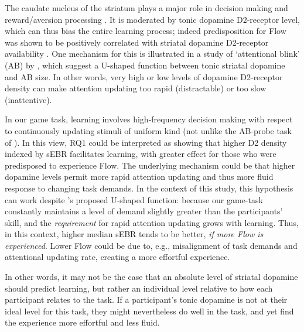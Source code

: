 \documentclass[10pt,letterpaper,floatsintext]{article}
\newcommand{\hl}{\textcolor{red!80}}
\begin{document}
The caudate nucleus of the striatum plays a major role in decision making and reward/aversion processing \citep{Slagter2015}. It is moderated by tonic dopamine D2-receptor level, which can thus bias the entire learning process; indeed predisposition for Flow was shown to be positively correlated with striatal dopamine D2-receptor availability \citep{DeManzano2013}. One mechanism for this is illustrated in a study of `attentional blink' (AB) by \citet{Slagter2012}, which suggest a U-shaped function between tonic striatal dopamine and AB size. In other words, very high or low levels of dopamine D2-receptor density can make attention updating too rapid (distractable) or too slow (inattentive).


In our game task, learning involves high-frequency decision making with respect to continuously updating stimuli of uniform kind (not unlike the AB-probe task of \citet{Slagter2012}). In this view, RQ1 could be interpreted as showing that higher D2 density indexed by sEBR facilitates learning, with greater effect for those who were predisposed to experience Flow. 
The underlying mechanism could be that higher dopamine levels permit more rapid attention updating and thus more fluid response to changing task demands. In the context of this study, this hypothesis can work despite \citet{Slagter2012}'s proposed U-shaped function: because our game-task constantly maintains a level of demand slightly greater than the participants' skill, and the {\it requirement} for rapid attention updating grows with learning. Thus, in this context, higher median sEBR tends to be better, \textit{if more Flow is experienced}. Lower Flow could be due to, e.g., misalignment of task demands and attentional updating rate, creating a more effortful experience.

In other words, it may not be the case that an absolute level of striatal dopamine should predict learning, but rather an individual level relative to how each participant relates to the task. If a participant's tonic dopamine is not at their ideal level for this task, they might nevertheless do well in the task, and yet find the experience more effortful and less fluid.
\end{document}
